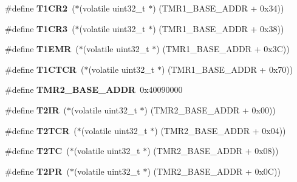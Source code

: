 \begin{DoxyCompactItemize}
\#define {\bfseries T1\+C\+R2}~($\ast$(volatile uint32\+\_\+t $\ast$) (T\+M\+R1\+\_\+\+B\+A\+S\+E\+\_\+\+A\+D\+DR + 0x34))
\item 
\mbox{\label{group__lpc24xx__regs_gaf6fcbf287e379c69b205ce6278519b17}} 
\#define {\bfseries T1\+C\+R3}~($\ast$(volatile uint32\+\_\+t $\ast$) (T\+M\+R1\+\_\+\+B\+A\+S\+E\+\_\+\+A\+D\+DR + 0x38))
\item 
\mbox{\label{group__lpc24xx__regs_gae67acb233642e3c0cf37c6599af4969f}} 
\#define {\bfseries T1\+E\+MR}~($\ast$(volatile uint32\+\_\+t $\ast$) (T\+M\+R1\+\_\+\+B\+A\+S\+E\+\_\+\+A\+D\+DR + 0x3\+C))
\item 
\mbox{\label{group__lpc24xx__regs_gaf5f4dd02c0c0835d84ed174f7c83d80b}} 
\#define {\bfseries T1\+C\+T\+CR}~($\ast$(volatile uint32\+\_\+t $\ast$) (T\+M\+R1\+\_\+\+B\+A\+S\+E\+\_\+\+A\+D\+DR + 0x70))
\item 
\mbox{\label{group__lpc24xx__regs_gaa2cce130a875918cc633a38c65720654}} 
\#define {\bfseries T\+M\+R2\+\_\+\+B\+A\+S\+E\+\_\+\+A\+D\+DR}~0x40090000
\item 
\mbox{\label{group__lpc24xx__regs_gaa11666ae9e802f9b9dd84518f52f7cfb}} 
\#define {\bfseries T2\+IR}~($\ast$(volatile uint32\+\_\+t $\ast$) (T\+M\+R2\+\_\+\+B\+A\+S\+E\+\_\+\+A\+D\+DR + 0x00))
\item 
\mbox{\label{group__lpc24xx__regs_ga9eb3294a66cb96acaa94e5849576b20d}} 
\#define {\bfseries T2\+T\+CR}~($\ast$(volatile uint32\+\_\+t $\ast$) (T\+M\+R2\+\_\+\+B\+A\+S\+E\+\_\+\+A\+D\+DR + 0x04))
\item 
\mbox{\label{group__lpc24xx__regs_gad2968c558b55fa74142b31d9264fc7b6}} 
\#define {\bfseries T2\+TC}~($\ast$(volatile uint32\+\_\+t $\ast$) (T\+M\+R2\+\_\+\+B\+A\+S\+E\+\_\+\+A\+D\+DR + 0x08))
\item 
\mbox{\label{group__lpc24xx__regs_ga2ce4e3cc8aa3ef6da5e0d5066153c81f}} 
\#define {\bfseries T2\+PR}~($\ast$(volatile uint32\+\_\+t $\ast$) (T\+M\+R2\+\_\+\+B\+A\+S\+E\+\_\+\+A\+D\+DR + 0x0\+C))
\item 

\end{DoxyCompactItemize}
